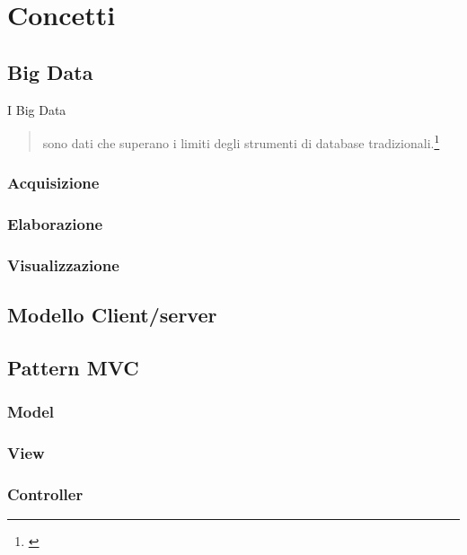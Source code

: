 \chapter{Concetti}%

\section{Big Data}\label{sec:bigdata}
I Big Data
\begin{quotation}
sono dati che superano i limiti degli strumenti di database tradizionali.\footnote{\cite{rezzani2013big}}
\end{quotation} 
		
\subsection{Acquisizione}
\subsection{Elaborazione}
\subsection{Visualizzazione}
\section{Modello Client/server}%
\section{Pattern MVC}
\subsection{Model}
\subsection{View}
\subsection{Controller}
	
	
